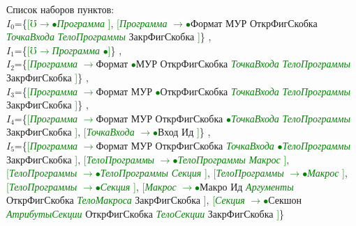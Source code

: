 \documentclass[a0]{a0poster}
\begin{document}
Список наборов пунктов:\\
$I_{0}$=\{\textcolor{Green}{[}\textcolor{Green}{$\mho$}\textcolor{Green}{$\to$}\textcolor{Green}{$\bullet$}\textcolor{Green}{\textit{Программа}} \textcolor{Green}{]}, \textcolor{Green}{[}\textcolor{Green}{\textit{Программа}} \textcolor{Green}{$\to$}\textcolor{Green}{$\bullet$}Формат МУР ОткрФигСкобка \textcolor{Green}{\textit{ТочкаВхода}} \textcolor{Green}{\textit{ТелоПрограммы}} ЗакрФигСкобка \textcolor{Green}{]}\}
,\\
$I_{1}$=\{\textcolor{Green}{[}\textcolor{Green}{$\mho$}\textcolor{Green}{$\to$}\textcolor{Green}{\textit{Программа}} \textcolor{Green}{$\bullet$}\textcolor{Green}{]}\}
,\\
$I_{2}$=\{\textcolor{Green}{[}\textcolor{Green}{\textit{Программа}} \textcolor{Green}{$\to$}Формат \textcolor{Green}{$\bullet$}МУР ОткрФигСкобка \textcolor{Green}{\textit{ТочкаВхода}} \textcolor{Green}{\textit{ТелоПрограммы}} ЗакрФигСкобка \textcolor{Green}{]}\}
,\\
$I_{3}$=\{\textcolor{Green}{[}\textcolor{Green}{\textit{Программа}} \textcolor{Green}{$\to$}Формат МУР \textcolor{Green}{$\bullet$}ОткрФигСкобка \textcolor{Green}{\textit{ТочкаВхода}} \textcolor{Green}{\textit{ТелоПрограммы}} ЗакрФигСкобка \textcolor{Green}{]}\}
,\\
$I_{4}$=\{\textcolor{Green}{[}\textcolor{Green}{\textit{Программа}} \textcolor{Green}{$\to$}Формат МУР ОткрФигСкобка \textcolor{Green}{$\bullet$}\textcolor{Green}{\textit{ТочкаВхода}} \textcolor{Green}{\textit{ТелоПрограммы}} ЗакрФигСкобка \textcolor{Green}{]}, \textcolor{Green}{[}\textcolor{Green}{\textit{ТочкаВхода}} \textcolor{Green}{$\to$}\textcolor{Green}{$\bullet$}Вход Ид \textcolor{Green}{]}\}
,\\
$I_{5}$=\{\textcolor{Green}{[}\textcolor{Green}{\textit{Программа}} \textcolor{Green}{$\to$}Формат МУР ОткрФигСкобка \textcolor{Green}{\textit{ТочкаВхода}} \textcolor{Green}{$\bullet$}\textcolor{Green}{\textit{ТелоПрограммы}} ЗакрФигСкобка \textcolor{Green}{]}, \textcolor{Green}{[}\textcolor{Green}{\textit{ТелоПрограммы}} \textcolor{Green}{$\to$}\textcolor{Green}{$\bullet$}\textcolor{Green}{\textit{ТелоПрограммы}} \textcolor{Green}{\textit{Макрос}} \textcolor{Green}{]}, \textcolor{Green}{[}\textcolor{Green}{\textit{ТелоПрограммы}} \textcolor{Green}{$\to$}\textcolor{Green}{$\bullet$}\textcolor{Green}{\textit{ТелоПрограммы}} \textcolor{Green}{\textit{Секция}} \textcolor{Green}{]}, \textcolor{Green}{[}\textcolor{Green}{\textit{ТелоПрограммы}} \textcolor{Green}{$\to$}\textcolor{Green}{$\bullet$}\textcolor{Green}{\textit{Макрос}} \textcolor{Green}{]}, \textcolor{Green}{[}\textcolor{Green}{\textit{ТелоПрограммы}} \textcolor{Green}{$\to$}\textcolor{Green}{$\bullet$}\textcolor{Green}{\textit{Секция}} \textcolor{Green}{]}, \textcolor{Green}{[}\textcolor{Green}{\textit{Макрос}} \textcolor{Green}{$\to$}\textcolor{Green}{$\bullet$}Макро Ид \textcolor{Green}{\textit{Аргументы}} ОткрФигСкобка \textcolor{Green}{\textit{ТелоМакроса}} ЗакрФигСкобка \textcolor{Green}{]}, \textcolor{Green}{[}\textcolor{Green}{\textit{Секция}} \textcolor{Green}{$\to$}\textcolor{Green}{$\bullet$}Секшон \textcolor{Green}{\textit{АтрибутыСекции}} ОткрФигСкобка \textcolor{Green}{\textit{ТелоСекции}} ЗакрФигСкобка \textcolor{Green}{]}\}
\end{document}
